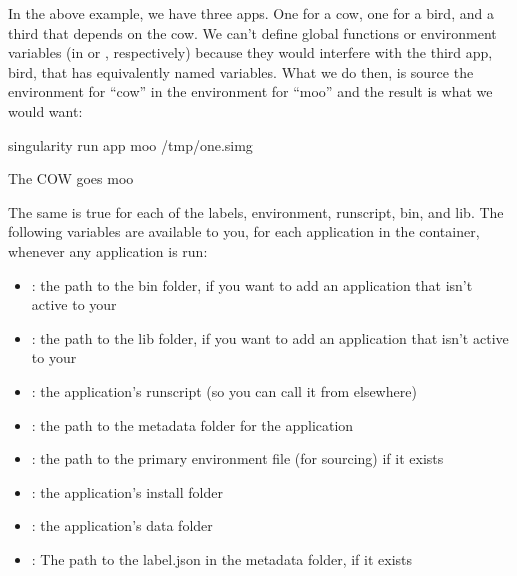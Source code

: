 \documentclass[letterpaper,10pt,english]{sphinxmanual}
\begin{document}
In the above example, we have three apps. One for a cow, one for a bird,
and a third that depends on the cow. We can’t define global functions or
environment variables (in  or   , respectively) because they would
interfere with the third app, bird, that has equivalently named
variables. What we do then, is source the environment for “cow” in the
environment for “moo” and the result is what we would want:

%
\begin{sphinxVerbatim}[commandchars=\\\{\}]
\PYGZdl{} singularity run \PYGZhy{}\PYGZhy{}app moo /tmp/one.simg

The COW goes moo
\end{sphinxVerbatim}

The same is true for each of the labels, environment, runscript, bin,
and lib. The following variables are available to you, for each application in
the container, whenever any application is run:
\begin{itemize}
\item {} 
: the path to the bin folder, if you want to add
an application that isn’t active to your 

\item {} 
: the path to the lib folder, if you want to add
an application that isn’t active to your 

\item {} 
: the application’s runscript (so you can call it from
elsewhere)

\item {} 
: the path to the metadata folder for the application

\item {} 
: the path to the primary environment file (for
sourcing) if it exists

\item {} 
: the application’s install folder

\item {} 
: the application’s data folder

\item {} 
: The path to the label.json in the metadata
folder, if it exists

\end{itemize}
\end{document}
